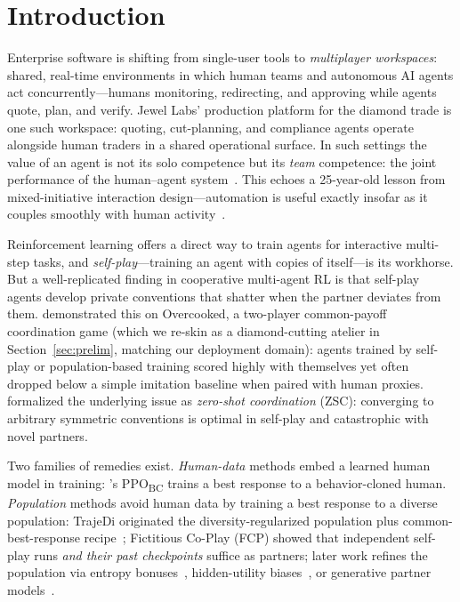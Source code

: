 \documentclass[11pt]{article}
\newcommand{\ppobc}{PPO\textsubscript{BC}}
\begin{document}
\section{Introduction}
\label{sec:intro}

Enterprise software is shifting from single-user tools to \emph{multiplayer
workspaces}: shared, real-time environments in which human teams and
autonomous AI agents act concurrently---humans monitoring, redirecting, and
approving while agents quote, plan, and verify. Jewel Labs' production
platform for the diamond trade is one such workspace: quoting, cut-planning,
and compliance agents operate alongside human traders in a shared operational
surface. In such settings the value of an agent is not its solo competence
but its \emph{team} competence: the joint performance of the human--agent
system~\citep{nationalacademies2022humanaiteaming}. This echoes a
25-year-old lesson from mixed-initiative interaction design---automation is
useful exactly insofar as it couples smoothly with human
activity~\citep{horvitz1999mixedinitiative}.

Reinforcement learning offers a direct way to train agents for interactive
multi-step tasks, and \emph{self-play}---training an agent with copies of
itself---is its workhorse. But a well-replicated finding in cooperative
multi-agent RL is that self-play agents develop private conventions that
shatter when the partner deviates from them. \citet{carroll2019utility}
demonstrated this on Overcooked, a two-player common-payoff coordination
game (which we re-skin as a diamond-cutting atelier in
Section~\ref{sec:prelim}, matching our deployment domain):
agents trained by self-play or population-based training scored highly with
themselves yet often dropped below a simple imitation baseline when paired
with human proxies. \citet{hu2020otherplay} formalized the underlying issue as
\emph{zero-shot coordination} (ZSC): converging to arbitrary symmetric
conventions is optimal in self-play and catastrophic with novel partners.

Two families of remedies exist. \emph{Human-data} methods embed a learned
human model in training: \citet{carroll2019utility}'s \ppobc{} trains a best
response to a behavior-cloned human. \emph{Population} methods avoid human
data by training a best response to a diverse population: TrajeDi
originated the diversity-regularized population plus common-best-response
recipe~\citep{lupu2021trajectory}; Fictitious Co-Play (FCP)
\citep{strouse2021collaborating} showed that independent self-play runs
\emph{and their past checkpoints} suffice as partners; later work refines
the population via entropy bonuses~\citep{zhao2023maximum},
hidden-utility biases~\citep{yu2023hsp}, or generative partner
models~\citep{liang2024gamma}.
\end{document}
